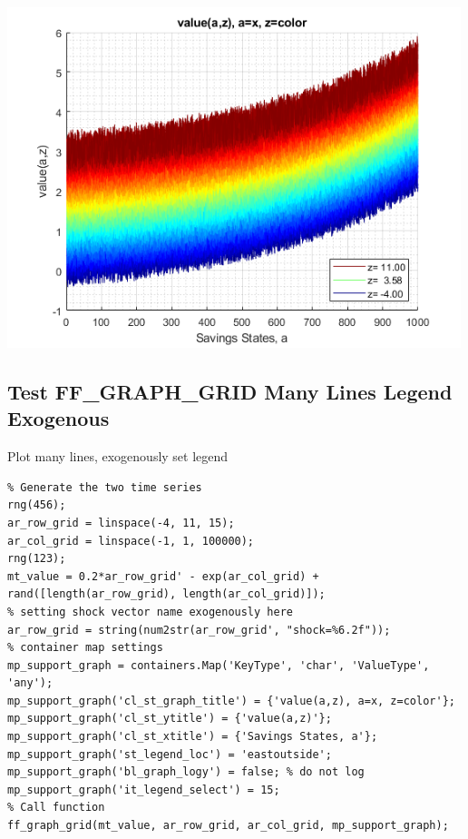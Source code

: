 \documentclass[
]{book}
\begin{document}
\includegraphics[width=5.20833in,height=\textheight]{img/fx_graph_grid_images/figure_3.png}

\hypertarget{test-ff_graph_grid-many-lines-legend-exogenous}{%
\subsection{Test FF\_GRAPH\_GRID Many Lines Legend Exogenous}\label{test-ff_graph_grid-many-lines-legend-exogenous}}

Plot many lines, exogenously set legend

\begin{verbatim}
% Generate the two time series
rng(456);
ar_row_grid = linspace(-4, 11, 15);
ar_col_grid = linspace(-1, 1, 100000);
rng(123);
mt_value = 0.2*ar_row_grid' - exp(ar_col_grid) + rand([length(ar_row_grid), length(ar_col_grid)]);
% setting shock vector name exogenously here
ar_row_grid = string(num2str(ar_row_grid', "shock=%6.2f"));
% container map settings
mp_support_graph = containers.Map('KeyType', 'char', 'ValueType', 'any');
mp_support_graph('cl_st_graph_title') = {'value(a,z), a=x, z=color'};
mp_support_graph('cl_st_ytitle') = {'value(a,z)'};
mp_support_graph('cl_st_xtitle') = {'Savings States, a'};
mp_support_graph('st_legend_loc') = 'eastoutside';
mp_support_graph('bl_graph_logy') = false; % do not log
mp_support_graph('it_legend_select') = 15;
% Call function
ff_graph_grid(mt_value, ar_row_grid, ar_col_grid, mp_support_graph);
\end{verbatim}
\end{document}
